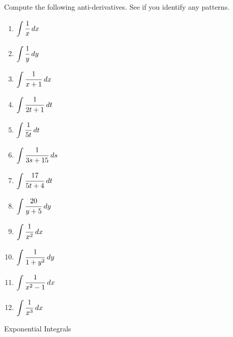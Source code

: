 \documentclass[12pt, letterpaper]{report}
\newcommand{\0}{\emptyset}
\theoremstyle{theorem}
\theoremstyle{definition}
\theoremstyle{definition}
\theoremstyle{definition}
\theoremstyle{definition}
\theoremstyle{theorem}
\theoremstyle{theorem}
\theoremstyle{remark}
\begin{document}
Compute the following anti-derivatives.  See if you identify any patterns.
\begin{multicols}{3}
\bfseries{\begin{Large}
	\begin{enumerate}
		\item $\displaystyle\int \cfrac{1}{x}\; dx$
		\vspace{3cm}
		\item $\displaystyle\int \cfrac{1}{y}\; dy$
		\vspace{3cm}
		\item $\displaystyle\int \cfrac{1}{x+1}\; dx$
		\vspace{3cm}
		\item $\displaystyle\int \cfrac{1}{2t+1}\; dt$
		\vspace{3cm}
		\item $\displaystyle\int \cfrac{1}{5t}\; dt$
		\vspace{3cm}
		\item $\displaystyle\int \cfrac{1}{3s+15}\; ds$
		\vspace{3cm}
		\item $\displaystyle\int \cfrac{17}{5t+4}\; dt$
		\vspace{3cm}
		\item $\displaystyle\int \cfrac{20}{y+5}\; dy$
		\vspace{3cm}
		\item $\displaystyle\int \cfrac{1}{x^2}\; dx$
		\vspace{3cm}
		\item $\displaystyle\int \cfrac{1}{1+y^2}\; dy$
		\vspace{3cm}
		\item $\displaystyle\int \cfrac{1}{x^2-1}\; dx$
		\vspace{3cm}
		\item $\displaystyle\int \cfrac{1}{x^3}\; dx$
	\end{enumerate}
\end{Large}}

\end{multicols}

\newpage

\begin{center}
\Large Exponential Integrals \\
\end{center}
\end{document}
